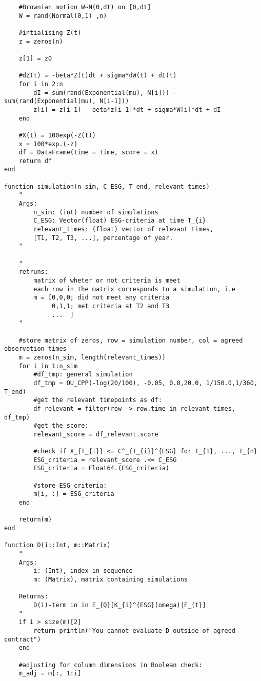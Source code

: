 \begin{verbatim}
    #Brownian motion W~N(0,dt) on [0,dt]
    W = rand(Normal(0,1) ,n)

    #intialising Z(t)
    z = zeros(n)

    z[1] = z0

    #dZ(t) = -beta*Z(t)dt + sigma*dW(t) + dI(t)
    for i in 2:n 
        dI = sum(rand(Exponential(mu), N[i])) - sum(rand(Exponential(mu), N[i-1]))
        z[i] = z[i-1] - beta*z[i-1]*dt + sigma*W[i]*dt + dI
    end

    #X(t) = 100exp(-Z(t))
    x = 100*exp.(-z)
    df = DataFrame(time = time, score = x)
    return df
end

function simulation(n_sim, C_ESG, T_end, relevant_times)
    "
    Args:
        n_sim: (int) number of simulations 
        C_ESG: Vector(float) ESG-criteria at time T_{i}            
        relevant_times: (float) vector of relevant times, 
        [T1, T2, T3, ...], percentage of year.
    "

    "
    retruns:
        matrix of wheter or not criteria is meet
        each row in the matrix corresponds to a simulation, i.e
        m = [0,0,0; did not meet any criteria
             0,1,1; met criteria at T2 and T3
             ...  ] 
    "
    
    #store matrix of zeros, row = simulation number, col = agreed observation times
    m = zeros(n_sim, length(relevant_times))
    for i in 1:n_sim
        #df_tmp: general simulation 
        df_tmp = OU_CPP(-log(20/100), -0.05, 0.0,20.0, 1/150.0,1/360, T_end)
        #get the relevant timepoints as df:
        df_relevant = filter(row -> row.time in relevant_times, df_tmp)
        #get the score:
        relevant_score = df_relevant.score
    
        #check if X_{T_{i}} <= C^_{T_{i}}^{ESG} for T_{1}, ..., T_{n}
        ESG_criteria = relevant_score .<= C_ESG 
        ESG_criteria = Float64.(ESG_criteria)
        
        #store ESG_criteria:
        m[i, :] = ESG_criteria
    end

    return(m)
end

function D(i::Int, m::Matrix)
    " 
    Args:
        i: (Int), index in sequence 
        m: (Matrix), matrix containing simulations

    Returns: 
        D(i)-term in in E_{Q}[K_{i}^{ESG}(omega)|F_{t}]    
    "
    if i > size(m)[2]
        return println("You cannot evaluate D outside of agreed contract")
    end
    
    #adjusting for column dimensions in Boolean check:
    m_adj = m[:, 1:i]


\end{verbatim}
